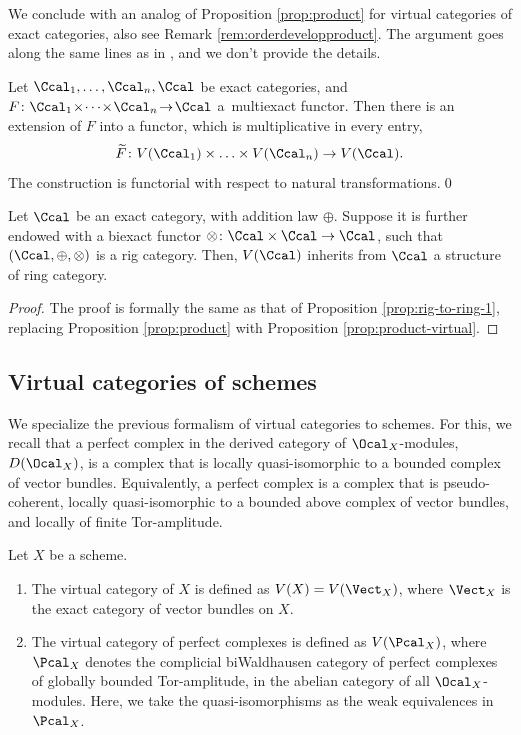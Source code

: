 We conclude with an analog of Proposition \ref{prop:product} for virtual categories of exact categories, also see Remark \ref{rem:orderdevelopproduct}. The argument goes along the same lines as in \loccit, and we don't provide the details.
\begin{proposition}\label{prop:product-virtual}
Let $\Ccal_{1},\ldots,\Ccal_{n},\Ccal$ be exact categories, and \hbox{$F\colon \Ccal_{1}\!\times\!\cdots\!\times\!\Ccal_{n}\!\to\!\Ccal$} a~multiexact functor. Then there is an extension of $F$ into a functor, which is multiplicative in every entry,
\begin{displaymath}
\widetilde{F}\colon V(\Ccal_{1})\times\ldots \times V(\Ccal_{n})\to V(\Ccal).
\end{displaymath}
The construction is functorial with respect to natural transformations.\qed
\end{proposition}

\begin{corollary}\label{cor:product-virtual}
Let $\Ccal$ be an exact category, with addition law $\oplus$. Suppose it is further endowed with a biexact functor $\otimes\colon\Ccal\times\Ccal\to\Ccal$, such that $(\Ccal,\oplus,\otimes)$ is a rig category. Then, $V(\Ccal)$ inherits from $\Ccal$ a structure of ring category.
\end{corollary}
\begin{proof}
The proof is formally the same as that of Proposition \ref{prop:rig-to-ring-1}, replacing Proposition \ref{prop:product} with Proposition \ref{prop:product-virtual}.
\end{proof}

\subsection{Virtual categories of schemes}\label{sec:virtual-schemes}
We specialize the previous formalism of virtual categories to schemes. For this, we recall that a perfect complex in the derived category of $\Ocal_X$-modules, $D(\Ocal_X)$, is a complex that is locally quasi-isomorphic to a bounded complex of vector bundles. Equivalently, a perfect complex is a complex that is pseudo-coherent, \ie locally quasi-isomorphic to a bounded above complex of vector bundles, and locally of finite Tor-amplitude.

\begin{definition}\label{def:virtual-category-perfect}
Let $X$ be a scheme.
\begin{enumerate}
\item The virtual category of $X$ is defined as $V(X) = V(\Vect_X)$, where $\Vect_{X}$ is the exact category of vector bundles on $X$.

\item The virtual category of perfect complexes is defined as $V(\Pcal_X)$, where $\Pcal_X$ denotes the complicial biWaldhausen category of perfect complexes of globally bounded Tor-amplitude, in the abelian category of all $\Ocal_X$-modules. Here, we take the quasi-isomorphisms as the weak equivalences in $\Pcal_{X}$.
\end{enumerate}
\end{definition}

